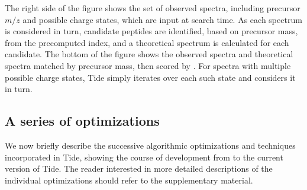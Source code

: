The right side of the figure shows the set of observed spectra,
including precursor $m/z$ and possible charge states, which are input
at search time. As each spectrum is considered in turn, candidate
peptides are identified, based on precursor mass, from the precomputed
index, and a theoretical spectrum is calculated for each
candidate. The bottom of the figure shows the observed spectra and
theoretical spectra matched by precursor mass, then scored by
\XCorr. For spectra with multiple possible charge states, Tide simply
iterates over each such state and considers it in turn.


\subsection{A series of optimizations \label{subsection:optimizations}}

We now briefly describe the successive algorithmic optimizations and
techniques incorporated in Tide, showing the course of development
from \tidezero to the current version of Tide. The reader interested
in more detailed descriptions of the individual optimizations should
refer to the supplementary material.


